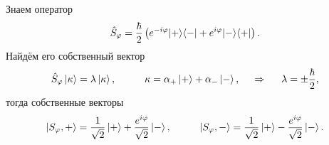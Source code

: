 Знаем оператор
\begin{equation*}
    \hat{S}_\varphi = \frac{\hbar}{2} \left(
        e^{- i \varphi} \kb{+}{-} + e^{i \varphi} \kb{-}{+}
    \right).
\end{equation*}
Найдём его собственный вектор
\begin{equation*}
    \hat{S}_\varphi \ket{\kappa} = \lambda \ket{\kappa},
    \hspace{10 mm} 
    \kappa = \alpha_+ \ket{+} + \alpha_- \ket{-},
    \hspace{0.5cm} \Rightarrow \hspace{0.5cm}
    \lambda = \pm \frac{\hbar}{2},
\end{equation*}
тогда собственные векторы
\begin{equation*}
    \ket{S_\varphi, +} = \frac{1}{\sqrt{2}} \ket{+} + \frac{e^{i \varphi}}{\sqrt{2}} \ket{-},
    \hspace{10 mm} 
    \ket{S_\varphi, -} = \frac{1}{\sqrt{2}} \ket{+} - \frac{e^{i \varphi}}{\sqrt{2}} \ket{-}.
\end{equation*}
